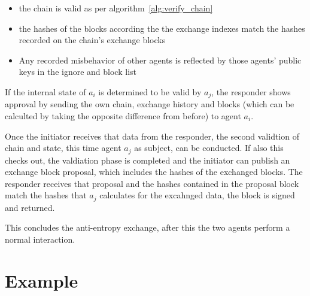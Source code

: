 \begin{itemize}
    \item the chain is valid as per algorithm~\ref{alg:verify_chain}
    \item the hashes of the blocks according the the exchange indexes match the hashes recorded on
    the chain's exchange blocks
    \item Any recorded misbehavior of other agents is reflected by those agents' public keys in the 
    ignore and block list
\end{itemize}

If the internal state of $a_i$ is determined to be valid by $a_j$, the responder shows approval by 
sending the own chain, exchange history and blocks (which can be calculted by taking the opposite
difference from before) to agent $a_i$. 

Once the initiator receives that data from the responder, the second validtion of chain and state, 
this time agent $a_j$ as subject, can be conducted. If also this checks out, the valdiation phase is 
completed and the initiator can publish an exchange block proposal, which includes the hashes of the
exchanged blocks. The responder receives that proposal and the hashes contained in the proposal block
match the hashes that $a_j$ calculates for the excahnged data, the block is signed and returned.

This concludes the anti-entropy exchange, after this the two agents perform a normal interaction.

\section{Example}


